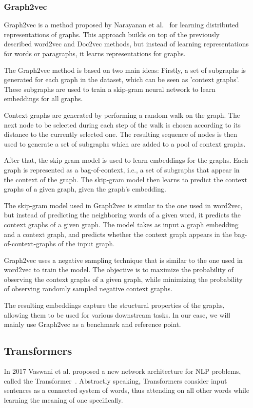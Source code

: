 \subsubsection{Graph2vec}
Graph2vec is a method proposed by Narayanan et al.~\cite{2017graph2vec} for learning distributed representations of graphs. This approach builds on top of the previously described word2vec and Doc2vec methods, but instead of learning representations for words or paragraphs, it learns representations for graphs.

The Graph2vec method is based on two main ideas: Firstly, a set of subgraphs is generated for each graph in the dataset, which can be seen as 'context graphs'. These subgraphs are used to train a skip-gram neural network to learn embeddings for all graphs.

Context graphs are generated by performing a random walk on the graph. The next node to be selected during each step of the walk is chosen according to its distance to the currently selected one. The resulting sequence of nodes is then used to generate a set of subgraphs which are added to a pool of context graphs.

After that, the skip-gram model is used to learn embeddings for the graphs. Each graph is represented as a bag-of-context, i.e., a set of subgraphs that appear in the context of the graph. The skip-gram model then learns to predict the context graphs of a given graph, given the graph's embedding.

The skip-gram model used in Graph2vec is similar to the one used in word2vec, but instead of predicting the neighboring words of a given word, it predicts the context graphs of a given graph. The model takes as input a graph embedding and a context graph, and predicts whether the context graph appears in the bag-of-context-graphs of the input graph.

Graph2vec uses a negative sampling technique that is similar to the one used in word2vec to train the model. The objective is to maximize the probability of observing the context graphs of a given graph, while minimizing the probability of observing randomly sampled negative context graphs.

The resulting embeddings capture the structural properties of the graphs, allowing them to be used for various downstream tasks. In our case, we will mainly use Graph2vec as a benchmark and reference point.

\subsection{Transformers}
In 2017 Vaswani et al. proposed a new network architecture for NLP problems, called the Transformer~\cite{vaswani2017attention}. Abstractly speaking, Transformers consider input sentences as a connected system of words, thus attending on all other words while learning the meaning of one specifically.

